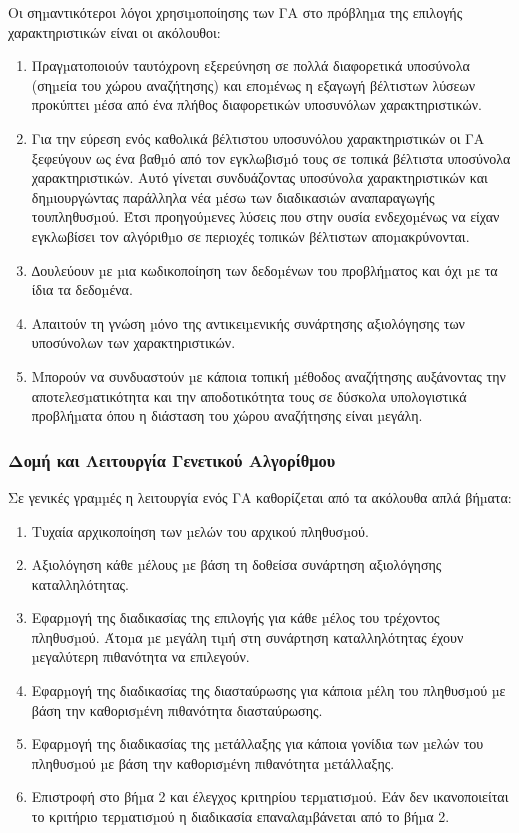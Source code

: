  Οι σηµαντικότεροι λόγοι
 χρησιµοποίησης των ΓΑ στο πρόβληµα της επιλογής χαρακτηριστικών είναι οι
 ακόλουθοι:
 \begin{enumerate}
 	\item Πραγµατοποιούν ταυτόχρονη εξερεύνηση σε πολλά διαφορετικά υποσύνολα (σηµεία του χώρου αναζήτησης) και εποµένως η εξαγωγή βέλτιστων λύσεων προκύπτει µέσα από ένα πλήθος διαφορετικών υποσυνόλων χαρακτηριστικών.
 	\item Για την εύρεση ενός καθολικά βέλτιστου υποσυνόλου χαρακτηριστικών οι ΓΑ ξεφεύγουν ως ένα βαθµό από τον εγκλωβισµό τους σε τοπικά βέλτιστα υποσύνολα χαρακτηριστικών. Αυτό γίνεται συνδυάζοντας υποσύνολα χαρακτηριστικών και δηµιουργώντας παράλληλα νέα µέσω των διαδικασιών αναπαραγωγής τουπληθυσµού. Έτσι προηγούµενες λύσεις που στην ουσία ενδεχοµένως να είχαν εγκλωβίσει τον αλγόριθµο σε περιοχές τοπικών βέλτιστων αποµακρύνονται.
 	\item ∆ουλεύουν µε µια κωδικοποίηση των δεδοµένων του προβλήµατος και όχι µε τα ίδια τα δεδοµένα.
 	\item Απαιτούν τη γνώση µόνο της αντικειµενικής συνάρτησης αξιολόγησης των υποσύνολων των χαρακτηριστικών.
 	\item Μπορούν να συνδυαστούν µε κάποια τοπική µέθοδος αναζήτησης αυξάνοντας την αποτελεσµατικότητα και την αποδοτικότητα τους σε δύσκολα υπολογιστικά προβλήµατα όπου η διάσταση του χώρου αναζήτησης είναι µεγάλη.
 \end{enumerate}
 \subsubsection{Δομή και Λειτουργία Γενετικού Αλγορίθμου}
 Σε γενικές γραµµές η λειτουργία ενός ΓΑ καθορίζεται από τα ακόλουθα απλά
 βήµατα:
 \begin{enumerate}
 	\item Τυχαία αρχικοποίηση των µελών του αρχικού πληθυσµού.
 	\item Αξιολόγηση κάθε µέλους µε βάση τη δοθείσα συνάρτηση αξιολόγησης
 	καταλληλότητας.
 	\item  Εφαρµογή της διαδικασίας της επιλογής για κάθε µέλος του τρέχοντος πληθυσµού. Άτοµα µε µεγάλη τιµή στη συνάρτηση καταλληλότητας έχουν µεγαλύτερη πιθανότητα να επιλεγούν.
 	\item Εφαρµογή της διαδικασίας της διασταύρωσης για κάποια µέλη του πληθυσµού µε βάση την καθορισµένη πιθανότητα διασταύρωσης.
 	\item Εφαρµογή της διαδικασίας της µετάλλαξης για κάποια γονίδια των µελών του πληθυσµού µε βάση την καθορισµένη πιθανότητα µετάλλαξης.
 	\item Επιστροφή στο βήµα 2 και έλεγχος κριτηρίου τερµατισµού. Εάν δεν ικανοποιείται το κριτήριο τερµατισµού η διαδικασία επαναλαµβάνεται από το βήµα 2.
 \end{enumerate}
 

